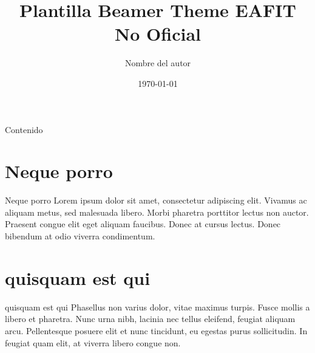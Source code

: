 \documentclass[aspectratio=43]{beamer}
\author{Nombre del autor}
\title{Plantilla Beamer Theme EAFIT No Oficial}
\date{\today}
\begin{document}
\begin{frame}

\end{frame}

\begin{frame}
  \titlepage
\end{frame}
\begin{frame}{Contenido}
  \tableofcontents
\end{frame}

\section{Neque porro}
\begin{frame}{Neque porro}
  Lorem ipsum dolor sit amet, consectetur adipiscing elit. Vivamus ac
  aliquam metus, sed malesuada libero. Morbi pharetra porttitor lectus
  non auctor. Praesent congue elit eget aliquam faucibus. Donec at
  cursus lectus. Donec bibendum at odio viverra condimentum.
\end{frame}
\section{quisquam est qui }

\begin{frame}{quisquam est qui }
  Phasellus non varius dolor, vitae maximus turpis. Fusce mollis a
  libero et pharetra. Nunc urna nibh, lacinia nec tellus eleifend,
  feugiat aliquam arcu. Pellentesque posuere elit et nunc tincidunt,
  eu egestas purus sollicitudin. In feugiat quam elit, at viverra
  libero congue non.
\end{frame}
\end{document}
